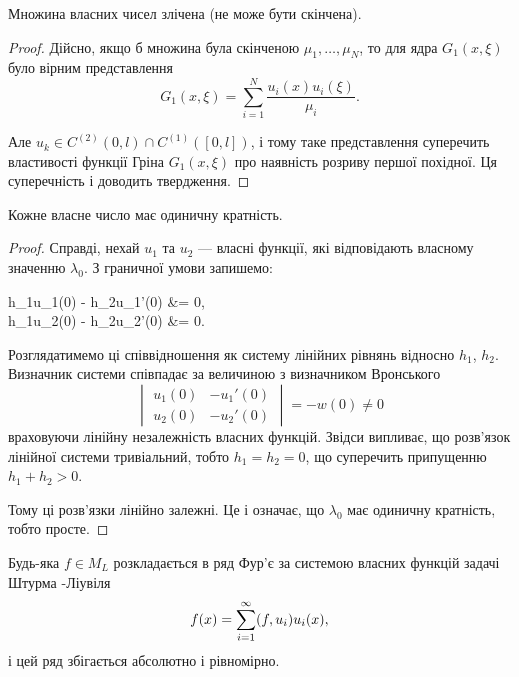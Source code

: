 \begin{proposition}
	Множина власних чисел злічена (не може бути скінчена).
\end{proposition}

\begin{proof}
	Дійсно, якщо б множина була скінченою $\mu_1, \ldots, \mu_N$, то для ядра $G_1(x, \xi)$ було вірним представлення 
	\begin{equation}
		G_1(x, \xi) = \sum_{i=1}^N \frac{u_i(x)u_i(\xi)}{\mu_i}.
	\end{equation}

	Але $u_k\in C^{(2)}(0,l)\cap C^{(1)}([0, l])$, і тому таке представлення суперечить властивості функції Гріна $G_1(x, \xi)$ про наявність розриву першої похідної. Ця суперечність і доводить твердження.
\end{proof}

\begin{proposition}
	Кожне власне число має одиничну кратність.
\end{proposition}

\begin{proof}
	Справді, нехай $u_1$ та $u_2$ --- власні функції, які відповідають власному значенню $\lambda_0$. З граничної умови запишемо:
	\begin{system}
		h_1u_1(0) - h_2u_1'(0) &= 0, \\
		h_1u_2(0) - h_2u_2'(0) &= 0.
	\end{system}

	Розглядатимемо ці співвідношення як систему лінійних рівнянь відносно $h_1$, $h_2$. Визначник системи співпадає за величиною з визначником Вронського 
	\begin{equation}
		\begin{vmatrix} u_1(0) & -u_1'(0) \\ u_2(0) & -u_2'(0)\end{vmatrix} = -w(0) \ne 0
	\end{equation}
	враховуючи лінійну незалежність власних функцій. Звідси випливає, що розв'язок лінійної системи тривіальний, тобто $h_1 = h_2 = 0$, що суперечить припущенню $h_1 + h_2 > 0$. \medskip

	Тому ці розв'язки лінійно залежні. Це і означає, що $\lambda_0$ має одиничну кратність, тобто просте.
\end{proof}

\begin{theorem}
	Будь-яка $f \in M_L$ розкладається в ряд Фур'є за системою власних функцій задачі Штурма -Ліувіля
	\begin{equation}
		f(x) = \displaystyle\sum\limits_{i=1}^\infty (f, u_i) u_i(x),
	\end{equation} 
	і цей ряд збігається абсолютно і рівномірно.
\end{theorem}

